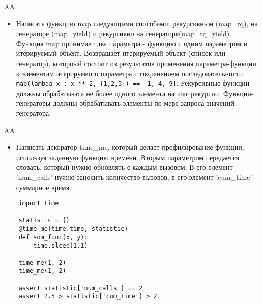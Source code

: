 \documentclass{article}
\begin{document}
\begin{center} AA \end{center}
\begin{itemize}
    \item Написать функцию map следующими способами: рекурсивным (map\_rq), 
        на генераторе (map\_yield) и рекурсивно на генераторе(map\_rq\_yield).
        Функция map принимает два параметра - функцию с одним параметром и итерируемый объект. 
        Возвращает итерируемый объект (список или генератор), котороый состоит из результатов
        применения параметра-функции к элементам итерируемого параметра с сохранением последовательности.
        \lstinline!map(lambda x : x ** 2, [1,2,3]) == [1, 4, 9]!.
        Рекурсивные функции должны обрабатывать не более одного элемента на шаг рекурсии.
        Функции-генераторы должны обрабатывать элементы по мере запроса значений генератора.
\end{itemize}
\newpage

\begin{center} AA \end{center}
\begin{itemize}
    \item Написать декоратор time\_me, который делает профилирование функции, 
        используя заданную функцию времени. Вторым параметром передается словарь,
        который нужно обновлять с каждым вызовом. В его елемент 'num\_calls' нужно
        заносить количество вызовов, в его элемент 'cum\_time' суммарное время.
\end{itemize}
\vspace{15pt}
\begin{lstlisting}
    import time

    statistic = {}
    @time_me(time.time, statistic)
    def som_func(x, y):
        time.sleep(1.1)

    time_me(1, 2)
    time_me(1, 2)

    assert statistic['num_calls'] == 2
    assert 2.5 > statistic['cum_time'] > 2
\end{lstlisting}
\newpage
\end{document}
